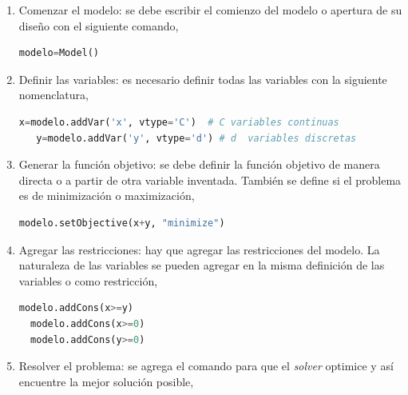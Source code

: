 \begin{enumerate}
    \item Comenzar el modelo: se debe escribir el comienzo del modelo o apertura de su diseño con el siguiente comando,
    
    \begin{footnotesize}
    \begin{lstlisting}[language=Python]
   modelo=Model()
   \end{lstlisting}
    \end{footnotesize}
   
   \item Definir las variables: es necesario definir todas las variables con la siguiente nomenclatura,
   
   \begin{footnotesize}
   \begin{lstlisting}[language=Python]
   x=modelo.addVar('x', vtype='C')  # C variables continuas 
   y=modelo.addVar('y', vtype='d') # d  variables discretas 
   \end{lstlisting}
   \end{footnotesize}
   
   \item Generar la función objetivo: se debe definir la función objetivo de manera directa o a partir de otra variable inventada. También se define si el problema es de minimización o maximización,
   
   \begin{footnotesize}
   \begin{lstlisting}[language=Python]
  modelo.setObjective(x+y, "minimize")
  \end{lstlisting}
   \end{footnotesize}
   
  \item Agregar las restricciones: hay que agregar las restricciones del modelo. La naturaleza de las variables se pueden agregar en la misma definición de las variables o como restricción,
  
  \begin{footnotesize}
  \begin{lstlisting}[language=Python]
  modelo.addCons(x>=y)
  modelo.addCons(x>=0)
  modelo.addCons(y>=0)
  \end{lstlisting}
  \end{footnotesize}
  
  
  \item  Resolver el problema: se agrega el comando para que el \textit{solver} optimice y así encuentre la mejor solución posible,
  

\end{enumerate}
